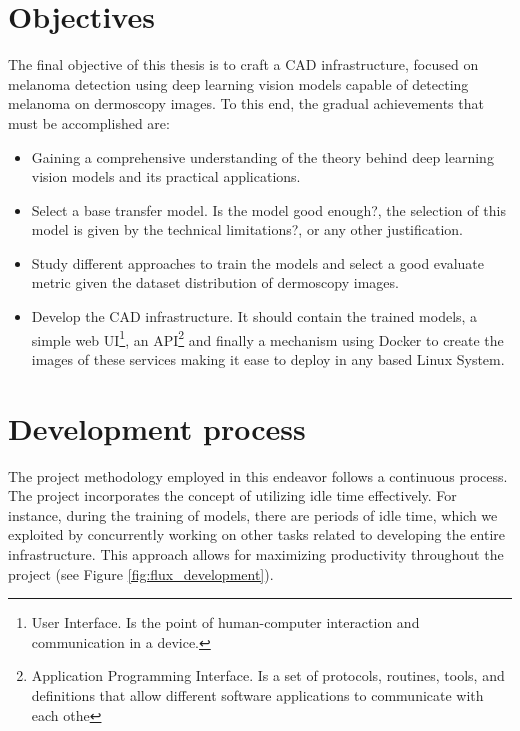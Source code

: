 \newpage

\section{Objectives}

The final objective of this thesis is to craft a CAD infrastructure,
focused on melanoma detection using deep learning vision models capable of detecting melanoma on dermoscopy images. To this end, the gradual achievements that
must be accomplished are:

\begin{itemize}

  \item Gaining a comprehensive understanding of the theory
    behind deep learning vision models and its practical applications.

   \item Select a base transfer model. Is the model good enough?, the selection of this model is given by the technical limitations?, or any other justification.

  \item Study different approaches to train the models and select a good  evaluate metric given the dataset distribution of dermoscopy images.

  \item  Develop the CAD infrastructure. It should contain
    the  trained models, a simple web UI\footnote{User Interface. Is
    the point of human-computer interaction and communication in a device.}, an
    API\footnote{Application Programming Interface. Is a set of protocols,
      routines, tools, and definitions that allow different software applications
    to communicate with each othe} and finally a mechanism using Docker to create
    the images of these services making it ease to deploy in any based Linux System.

\end{itemize}


\section{Development process}

The project methodology employed in this endeavor follows a continuous process.
The project incorporates the concept of utilizing idle time effectively. For
instance, during the training of models, there are periods of idle time, which
we exploited by concurrently working on other tasks related to developing the
entire infrastructure. This approach allows for maximizing productivity
throughout the project (see Figure \ref{fig:flux_development}).

